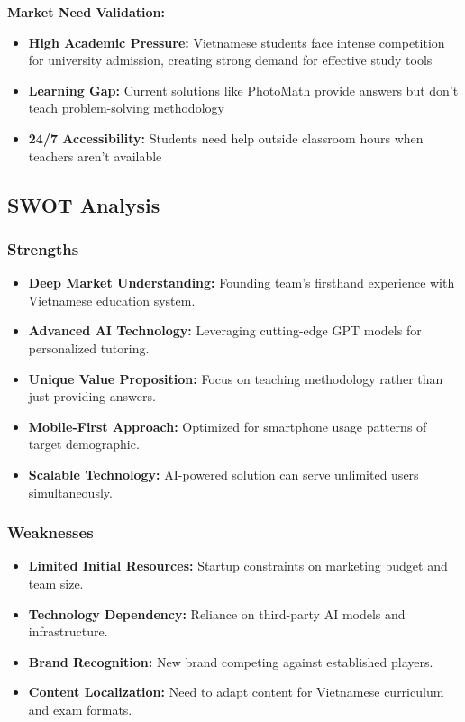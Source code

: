 \textbf{Market Need Validation:}
\begin{itemize}
    \item \textbf{High Academic Pressure:}
        Vietnamese students face intense competition for university admission, creating strong demand for effective 
        study tools
    \item \textbf{Learning Gap:}
        Current solutions like PhotoMath provide answers but don't teach problem-solving methodology
    \item \textbf{24/7 Accessibility:}
        Students need help outside classroom hours when teachers aren't available
\end{itemize}

\subsection{SWOT Analysis}
\subsubsection{Strengths}
\begin{itemize}
    \item \textbf{Deep Market Understanding:} Founding team's firsthand experience with Vietnamese education system.
    \item \textbf{Advanced AI Technology:} Leveraging cutting-edge GPT models for personalized tutoring.
    \item \textbf{Unique Value Proposition:} Focus on teaching methodology rather than just providing answers.
    \item \textbf{Mobile-First Approach:} Optimized for smartphone usage patterns of target demographic.
    \item \textbf{Scalable Technology:} AI-powered solution can serve unlimited users simultaneously.
\end{itemize}

\subsubsection{Weaknesses}
\begin{itemize}
    \item \textbf{Limited Initial Resources:} Startup constraints on marketing budget and team size.
    \item \textbf{Technology Dependency:} Reliance on third-party AI models and infrastructure.
    \item \textbf{Brand Recognition:} New brand competing against established players.
    \item \textbf{Content Localization:} Need to adapt content for Vietnamese curriculum and exam formats.
\end{itemize}


